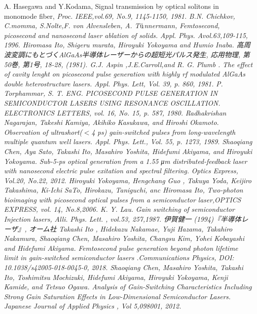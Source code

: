 \begin{thebibliography}{99}
 A. Hasegawa and Y.Kodama, Signal transmission by optical solitons in monomode fiber, \sl Proc. IEEE\rm ,vol.69, No.9, 1145-1150, 1981.
 B.N. Chichkov, C.momma, S.Nolte,F. von Alvensleben, A. T$\rm{\ddot{u}}$nnermann, Femtosecond, picosecond and nanosecond laser ablation of solids. \sl Appl. Phys. A\rm vol.63,109-115, 1996.
 Hiromasa Ito, Shigeru 
murata, Hiroyuki Yokoyama and Humio Inaba. 高周波変調にもとづくAlGaAs半導体レーザーからの超短光パルス発生, 応用物理, 第50巻, 第1号, 18-28, (1981).
 G.J. Aspin ,J.E.Carroll,and R. G. Plumb . The effect of cavity lenght on picosecond pulse generation with highly rf modulated AlGaAs double heterostructure lasers. \sl Appl. Phys. Lett\rm , Vol. 39, p. 860, 1981.
 P. Torphammar, S. T. ENG. PICOSECOND PULSE GENERATION IN SEMICONDUCTOR LASERS USING RESONANCE OSCILLATION. \sl ELECTRONICS LETTERS\rm , vol. 16, No. 15, p. 587, 1980.
 Radhakrishan Nagarajan, Takeshi Kamiya, Akihiko Kasukawa, and Hiroshi Okamoto. Observation of ultrashort($< $4 ps) gain-switched pulses from long-wavelength multiple quantum well lasers. \sl Appl. Phys. Lett.\rm , Vol. 55, p. 1273, 1989.
 Shaoqiang Chen, Aya Sato, Takashi Ito, Masahiro Yoshita, Hidefumi Akiyama, and Hiroyuki Yokoyama. Sub-5-ps optical generation from a 1.55 \si{\micro\metre} distributed-feedback laser with nanosecond electric pulse exitation and spectral filtering. \sl Optics Express\rm , Vol.20, No.22, 2012.
 Hiroyuki Yokoyama, Hengchang Guo , Takuya Yoda, Keijiro Takashima, Ki-Ichi SaTo, Hirokazu, Taniguchi, anc Hiromasa Ito, Two-photon bioimaging with picosecond optical pulses from a semiconductor laser,\sl OPTICS EXPRESS\rm , vol. 14, No.8,2006.
 K. Y. Lau. Gain switching of semiconductor Injection lasers, \sl Alli. Phys. Lett. \rm , vol.53, 257,1987.
 伊賀健一 (1994)『半導体レーザ』, オーム社
Takashi Ito
, Hidekazu Nakamae, Yuji Hazama, Takahiro Nakamura, Shaoqiang Chen, Masahiro Yoshita, Changsu Kim, Yohei Kobayashi and Hidefumi Akiyama.
Femtosecond pulse generation beyond photon lifetime limit in gain-switched semiconductor lasers .\sl Communications Physics\rm , DOI: 10.1038/s42005-018-0045-0, 2018. 
 Shaoqiang Chen, Masahiro Yoshita, Takashi Ito, Toshimitsu Mochizuki, Hidefumi Akiyama, Hiroyuki Yokoyama, Kenji Kamide, and Tetsuo Ogawa. Analysis of Gain-Switching Characteristics Including Strong Gain Saturation Effects in Low-Dimensional Semiconductor Lasers. \sl Japanese Journal of Applied  Physics \rm , Vol 5,098001, 2012.

\end{thebibliography}
